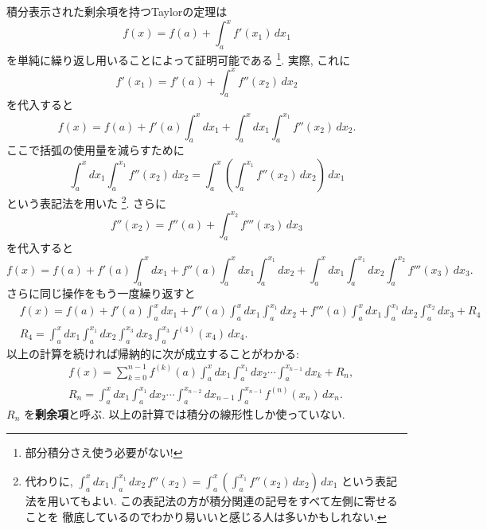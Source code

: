 \documentclass[12pt,twoside]{jarticle}
\theoremstyle{jplain}
\theoremstyle{jplain}
\theoremstyle{jplain}
\numberwithin{theorem}{section}
\numberwithin{equation}{section}
\numberwithin{figure}{section}
\numberwithin{table}{section}
\begin{document}
積分表示された剰余項を持つTaylorの定理は
\[
f(x)=f(a)+\int_a^x f'(x_1)\,dx_1
\]
を単純に繰り返し用いることによって証明可能である%
\footnote{部分積分さえ使う必要がない!}.
実際, これに
\[
f'(x_1)=f'(a)+\int_a^x f''(x_2)\,dx_2
\]
を代入すると
\[
f(x)=f(a)+f'(a) \int_a^x dx_1+\int_a^x dx_1\int_a^{x_1} f''(x_2)\,dx_2.
\]
ここで括弧の使用量を減らすために
\[
\int_a^x dx_1\int_a^{x_1} f''(x_2)\,dx_2
=\int_a^x \left(\int_a^{x_1} f''(x_2)\,dx_2 \right)\,dx_1
\]
という表記法を用いた%
\footnote{代わりに,
\(\displaystyle
\int_a^x dx_1\int_a^{x_1}dx_2\, f''(x_2)
=\int_a^x \left(\int_a^{x_1} f''(x_2)\,dx_2 \right)\,dx_1
\)
という表記法を用いてもよい.
この表記法の方が積分関連の記号をすべて左側に寄せることを
徹底しているのでわかり易いいと感じる人は多いかもしれない.}.
さらに
\[
f''(x_2)=f''(a)+\int_a^{x_2} f'''(x_3)\,dx_3
\]
を代入すると
\[
f(x)=f(a)+f'(a)\int_a^x\!\!\!dx_1+f''(a)\int_a^x\!\!\!dx_1\int_a^{x_1}\!\!\!dx_2
+\int_a^x\!\!\!dx_1\int_a^{x_1}\!\!\!dx_2\int_a^{x_2}f'''(x_3)\,dx_3.
\]
さらに同じ操作をもう一度繰り返すと
\begin{align*}
&
f(x)=f(a)+f'(a)\int_a^x\!\!\!dx_1+f''(a)\int_a^x\!\!\!dx_1\int_a^{x_1}\!\!\!dx_2
+f'''(a)\int_a^x\!\!\!dx_1\int_a^{x_1}\!\!\!dx_2\int_a^{x_2}\!\!\!dx_3 +R_4
\\ &
R_4 = \int_a^x\!\!\!dx_1\int_a^{x_1}\!\!\!dx_2\int_a^{x_3}\!\!\!dx_3\int_a^{x_3}f^{(4)}(x_4)\,dx_4.
\end{align*}
以上の計算を続ければ帰納的に次が成立することがわかる:
\begin{align*}
&
f(x)=\sum_{k=0}^{n-1} f^{(k)}(a)\int_a^x\!\!\!dx_1\int_a^{x_1}\!\!\!dx_2\cdots\!\!\int_a^{x_{k-1}}\!\!\!dx_k + R_n,
\\ &
R_n=\int_a^x\!\!\!dx_1\int_a^{x_1}\!\!\!dx_2\cdots\int_a^{x_{n-2}}\!\!\!dx_{n-1}\int_a^{x_{n-1}}f^{(n)}(x_n)\,dx_n.
\end{align*}
$R_n$ を{\bfseries 剰余項}と呼ぶ.
以上の計算では積分の線形性しか使っていない.
\end{document}
